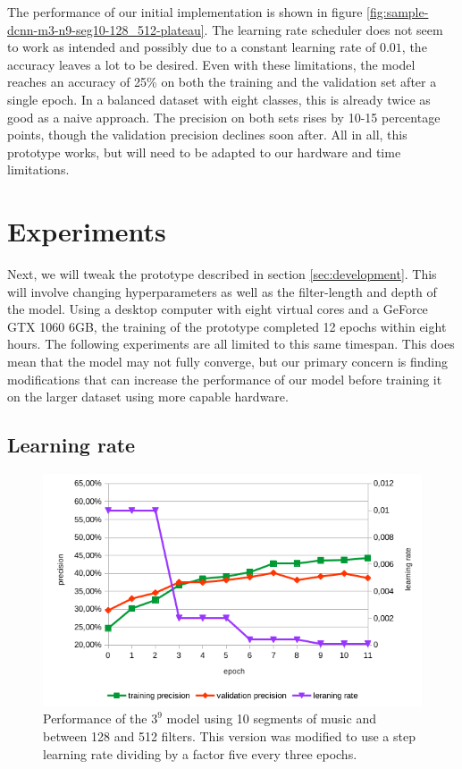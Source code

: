 The performance of our initial implementation is shown in figure \ref{fig:sample-dcnn-m3-n9-seg10-128_512-plateau}. The learning rate scheduler does not seem to work as intended and possibly due to a constant learning rate of $0.01$, the accuracy leaves a lot to be desired. Even with these limitations, the model reaches an accuracy of 25\% on both the training and the validation set after a single epoch. In a balanced dataset with eight classes, this is already twice as good as a naive approach. The precision on both sets rises by 10-15 percentage points, though the validation precision declines soon after. All in all, this prototype works, but will need to be adapted to our hardware and time limitations.


\section{Experiments}
\label{sec:experiments}

Next, we will tweak the prototype described in section \ref{sec:development}. This will involve changing hyperparameters as well as the filter-length and depth of the model. Using a desktop computer with eight virtual cores and a GeForce GTX 1060 6GB, the training of the prototype completed 12 epochs within eight hours. The following experiments are all limited to this same timespan. This does mean that the model may not fully converge, but our primary concern is finding modifications that can increase the performance of our model before training it on the larger dataset using more capable hardware. 

\subsection{Learning rate}

\label{subsec:learning_rate}
\begin{figure}[!htb]
	\centering
	\includegraphics[width=.9\linewidth]{images/sample-dcnn-m3-n9-seg10-128_512-step.png}
	\caption{Performance of the $3^9$ model using 10 segments of music and between 128 and 512 filters. This version was modified to use a step learning rate dividing by a factor five every three epochs.}
	\label{fig:sample-dcnn-m3-n9-seg10-128_512-step}
\end{figure}

